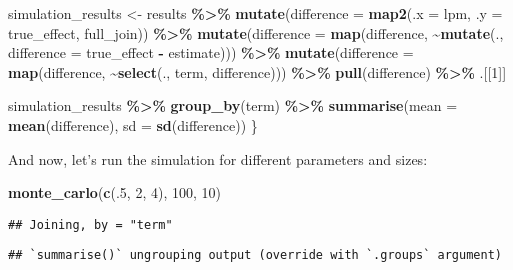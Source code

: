 \documentclass[
]{article}
\newenvironment{Shaded}{\begin{snugshade}}{\end{snugshade}}
\newcommand{\DataTypeTok}[1]{\textcolor[rgb]{0.13,0.29,0.53}{#1}}
\newcommand{\DecValTok}[1]{\textcolor[rgb]{0.00,0.00,0.81}{#1}}
\newcommand{\KeywordTok}[1]{\textcolor[rgb]{0.13,0.29,0.53}{\textbf{#1}}}
\newcommand{\NormalTok}[1]{#1}
\newcommand{\OperatorTok}[1]{\textcolor[rgb]{0.81,0.36,0.00}{\textbf{#1}}}
\newcommand{\StringTok}[1]{\textcolor[rgb]{0.31,0.60,0.02}{#1}}
\begin{document}
\begin{Shaded}
\begin{Highlighting}[]
\NormalTok{  simulation\_results \textless{}{-}}\StringTok{ }\NormalTok{results }\OperatorTok{\%\textgreater{}\%}\StringTok{ }
\StringTok{    }\KeywordTok{mutate}\NormalTok{(}\DataTypeTok{difference =} \KeywordTok{map2}\NormalTok{(}\DataTypeTok{.x =}\NormalTok{ lpm, }\DataTypeTok{.y =}\NormalTok{ true\_effect, full\_join)) }\OperatorTok{\%\textgreater{}\%}\StringTok{ }
\StringTok{    }\KeywordTok{mutate}\NormalTok{(}\DataTypeTok{difference =} \KeywordTok{map}\NormalTok{(difference, }\OperatorTok{\textasciitilde{}}\KeywordTok{mutate}\NormalTok{(., }\DataTypeTok{difference =}\NormalTok{ true\_effect }\OperatorTok{{-}}\StringTok{ }\NormalTok{estimate))) }\OperatorTok{\%\textgreater{}\%}\StringTok{ }
\StringTok{    }\KeywordTok{mutate}\NormalTok{(}\DataTypeTok{difference =} \KeywordTok{map}\NormalTok{(difference, }\OperatorTok{\textasciitilde{}}\KeywordTok{select}\NormalTok{(., term, difference))) }\OperatorTok{\%\textgreater{}\%}\StringTok{ }
\StringTok{    }\KeywordTok{pull}\NormalTok{(difference) }\OperatorTok{\%\textgreater{}\%}\StringTok{ }
\StringTok{    }\NormalTok{.[[}\DecValTok{1}\NormalTok{]]}

\NormalTok{  simulation\_results }\OperatorTok{\%\textgreater{}\%}\StringTok{ }
\StringTok{    }\KeywordTok{group\_by}\NormalTok{(term) }\OperatorTok{\%\textgreater{}\%}\StringTok{ }
\StringTok{    }\KeywordTok{summarise}\NormalTok{(}\DataTypeTok{mean =} \KeywordTok{mean}\NormalTok{(difference), }
              \DataTypeTok{sd =} \KeywordTok{sd}\NormalTok{(difference))}
\NormalTok{\}}
\end{Highlighting}
\end{Shaded}

And now, let's run the simulation for different parameters and sizes:

\begin{Shaded}
\begin{Highlighting}[]
\KeywordTok{monte\_carlo}\NormalTok{(}\KeywordTok{c}\NormalTok{(.}\DecValTok{5}\NormalTok{, }\DecValTok{2}\NormalTok{, }\DecValTok{4}\NormalTok{), }\DecValTok{100}\NormalTok{, }\DecValTok{10}\NormalTok{)}
\end{Highlighting}
\end{Shaded}

\begin{verbatim}
## Joining, by = "term"
\end{verbatim}

\begin{verbatim}
## `summarise()` ungrouping output (override with `.groups` argument)
\end{verbatim}
\end{document}
